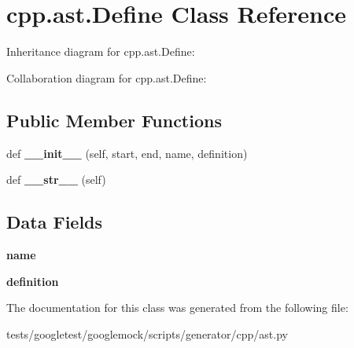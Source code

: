 \hypertarget{classcpp_1_1ast_1_1Define}{}\section{cpp.\+ast.\+Define Class Reference}
\label{classcpp_1_1ast_1_1Define}


Inheritance diagram for cpp.\+ast.\+Define\+:


Collaboration diagram for cpp.\+ast.\+Define\+:
\subsection*{Public Member Functions}
\begin{DoxyCompactItemize}
\item 
\mbox{\label{classcpp_1_1ast_1_1Define_ae9af61866e010a863ba9f8818ec8924c}} 
def {\bfseries \+\_\+\+\_\+init\+\_\+\+\_\+} (self, start, end, name, definition)
\item 
\mbox{\label{classcpp_1_1ast_1_1Define_aa89732914b19901c8d291e11f34bb627}} 
def {\bfseries \+\_\+\+\_\+str\+\_\+\+\_\+} (self)
\end{DoxyCompactItemize}
\subsection*{Data Fields}
\begin{DoxyCompactItemize}
\item 
\mbox{\label{classcpp_1_1ast_1_1Define_a8879216f09e88f79d7baa49bcfa10ebd}} 
{\bfseries name}
\item 
\mbox{\label{classcpp_1_1ast_1_1Define_a0c636652dfeb2f15e62793afea1153c9}} 
{\bfseries definition}
\end{DoxyCompactItemize}


The documentation for this class was generated from the following file\+:\begin{DoxyCompactItemize}
\item 
tests/googletest/googlemock/scripts/generator/cpp/ast.\+py\end{DoxyCompactItemize}
